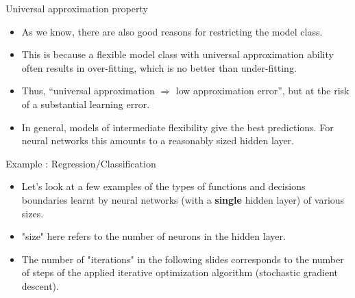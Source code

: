 \begin{vbframe}{Universal approximation property}
  \begin{itemize}
    \vspace{5mm}
    \item As we know, there are also good reasons for restricting the model class.
    \vspace{5mm}
    \item This is because a flexible model class with universal approximation
    ability often results in over-fitting, which is no better than
    under-fitting.
    \vspace{5mm}
    \item Thus, \enquote{universal approximation $\Rightarrow$ low approximation error}, but at the risk of a substantial learning error.
    \vspace{5mm}
    \item In general, models of intermediate flexibility give the best predictions.
    For neural networks this amounts to a reasonably sized hidden layer.
  \end{itemize}
\end{vbframe}

\begin{frame} {Example : Regression/Classification}
  \begin{itemize}
    \vspace{15mm}
    \item Let's look at a few examples of the types of functions and decisions boundaries learnt by neural networks (with a \textbf{single} hidden layer) of various sizes.
        \vspace{5mm}
        \item "size" here refers to the number of neurons in the hidden layer.
    \vspace{5mm}
    \item The number of "iterations" in the following slides corresponds to the number of steps of the applied iterative optimization algorithm (stochastic gradient descent).
  \end{itemize}
\end{frame}

